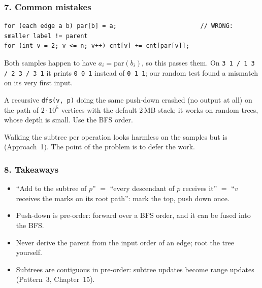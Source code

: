 \subsubsection*{7. Common mistakes}

\begin{warningbox}
\begin{lstlisting}[style=snippet]
for (each edge a b) par[b] = a;                       // WRONG: smaller label != parent
for (int v = 2; v <= n; v++) cnt[v] += cnt[par[v]];
\end{lstlisting}
Both samples happen to have $a_i = \mathrm{par}(b_i)$, so this passes them. On \texttt{3 1 / 1 3 / 2 3 / 3 1} it prints \texttt{0 0 1} instead of \texttt{0 1 1}; our random test found a mismatch on its very first input.
\end{warningbox}

\begin{warningbox}
A recursive \texttt{dfs(v, p)} doing the same push-down crashed (no output at all) on the path of $2\cdot10^5$ vertices with the default 2\,MB stack; it works on random trees, whose depth is small. Use the BFS order.
\end{warningbox}

\begin{warningbox}
Walking the subtree per operation looks harmless on the samples but is  (Approach~1). The point of the problem is to defer the work.
\end{warningbox}

\subsubsection*{8. Takeaways}

\begin{itemize}[leftmargin=*]
    \item ``Add to the subtree of $p$'' $=$ ``every descendant of $p$ receives it'' $=$ ``$v$ receives the marks on its root path'': mark the top, push down once.
    \item Push-down is pre-order: forward over a BFS order, and it can be fused into the BFS.
    \item Never derive the parent from the input order of an edge; root the tree yourself.
    \item Subtrees are contiguous in pre-order: subtree updates become range updates (Pattern~3, Chapter~15).
\end{itemize}

